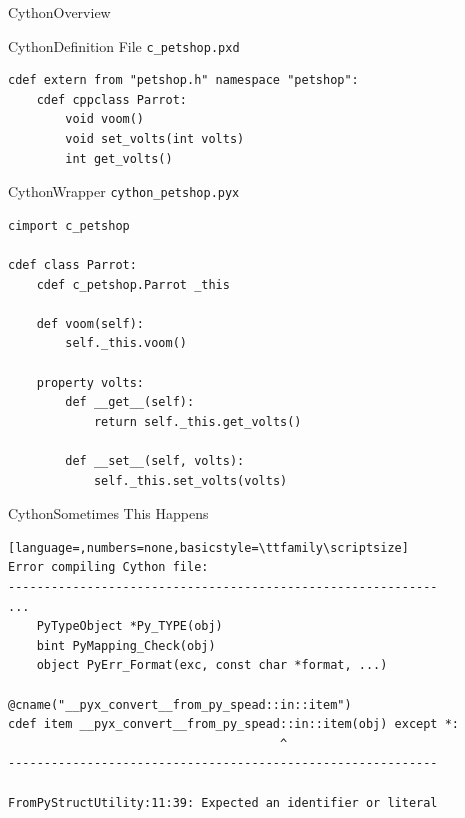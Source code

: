 \documentclass{beamer}
\begin{document}
\begin{frame}{Cython}{Overview}
  \begin{figure}
  \end{figure}
\end{frame}

\begin{frame}[fragile=singleslide]{Cython}{Definition File}
  \texttt{c_petshop.pxd}
  \begin{lstlisting}[language=cython]
cdef extern from "petshop.h" namespace "petshop":
    cdef cppclass Parrot:
        void voom()
        void set_volts(int volts)
        int get_volts()
  \end{lstlisting}
\end{frame}

\begin{frame}[fragile=singleslide]{Cython}{Wrapper}
  \texttt{cython_petshop.pyx}
  \begin{lstlisting}[language=cython]
cimport c_petshop

cdef class Parrot:
    cdef c_petshop.Parrot _this

    def voom(self):
        self._this.voom()

    property volts:
        def __get__(self):
            return self._this.get_volts()

        def __set__(self, volts):
            self._this.set_volts(volts)
  \end{lstlisting}
\end{frame}

\begin{frame}[fragile=singleslide]{Cython}{Sometimes This Happens}
  \begin{lstlisting}[language=,numbers=none,basicstyle=\ttfamily\scriptsize]
Error compiling Cython file:
------------------------------------------------------------
...
    PyTypeObject *Py_TYPE(obj)
    bint PyMapping_Check(obj)
    object PyErr_Format(exc, const char *format, ...)

@cname("__pyx_convert__from_py_spead::in::item")
cdef item __pyx_convert__from_py_spead::in::item(obj) except *:
                                      ^
------------------------------------------------------------

FromPyStructUtility:11:39: Expected an identifier or literal
  \end{lstlisting}
\end{frame}
\end{document}
